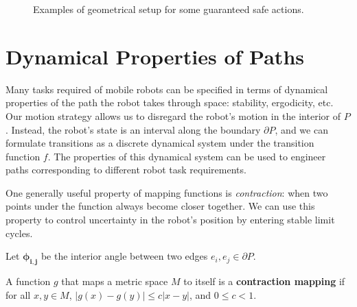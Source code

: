 \documentclass[]{styles/svproc}  %
\begin{document}
\begin{figure}
\begin{subfigure}{0.4\textwidth}
\centering
{}
\end{subfigure}
\caption{Examples of geometrical setup for some guaranteed safe actions.}
\label{fig:two_safe_cases}
\end{figure}


\section{Dynamical Properties of Paths}


Many tasks required of mobile robots can be specified in terms of dynamical properties of
the path the robot takes through space: stability, ergodicity, etc.
Our motion strategy allows us to disregard the robot's motion in the interior of
$P$. Instead, the robot's state is an interval 
along the boundary $\partial P$, and we can formulate transitions as a discrete
dynamical system under the transition function $f$. The properties of this
dynamical system can be used to engineer paths corresponding to different robot
task requirements.

One generally useful property of mapping functions is \emph{contraction}: 
when two points under the function always become closer together. We can use this property to control
uncertainty in the robot's position by entering stable limit cycles.

\begin{definition}
Let $\bm{\phi_{i,j}}$ be the interior angle between two edges $e_i, e_j \in \partial P$. 
\end{definition}

\begin{definition}

A function $g$ that maps a metric space $M$ to itself is a \textbf{contraction
mapping} if for all
$x, y \in M$, $\lvert g(x) - g(y) \rvert \leq c \lvert x-y \rvert$, and $0 \leq c < 1$.
\end{definition}
\end{document}
